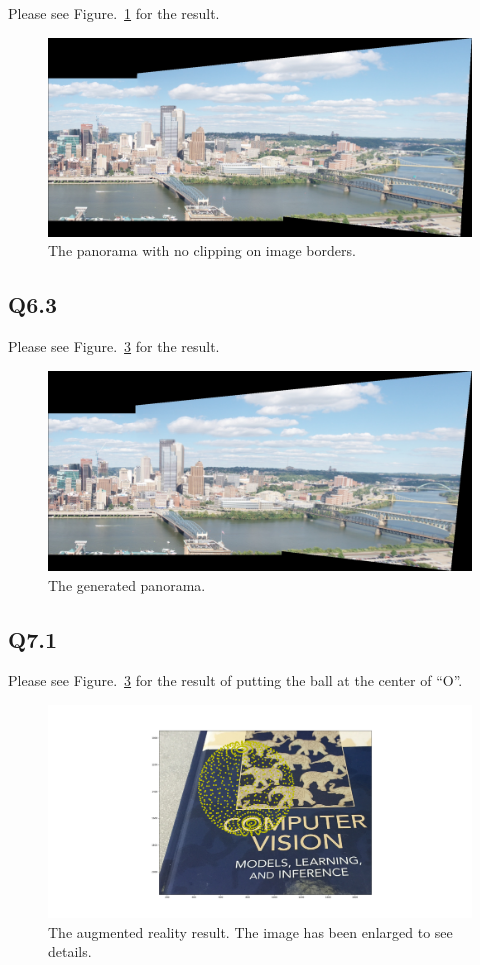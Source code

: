 \documentclass[11pt]{article}
\begin{document}
Please see Figure.~\ref{fig:q6.2} for the result.

\begin{figure}[h!]
    \centering
    \includegraphics[width=.8\linewidth]{../results/q6_2_pan.jpg}
    \caption{The panorama with no clipping on image borders. }
    \label{fig:q6.2}
\end{figure}

\newpage

\subsection*{Q6.3}

Please see Figure.~\ref{fig:q6.3} for the result.

\begin{figure}[h!]
    \centering
    \includegraphics[width=.8\linewidth]{../results/q6_3.jpg}
    \caption{The generated panorama. }
    \label{fig:q6.3}
\end{figure}

\newpage

\subsection*{Q7.1}

Please see Figure.~\ref{fig:q6.3} for the result of putting the ball at the center of ``O''.

\begin{figure}[h!]
    \centering
    \includegraphics[width=\linewidth]{../results/q7_2.png}
    \caption{The augmented reality result. The image has been enlarged to see details.  }
    \label{fig:q6.3}
\end{figure}
\end{document}
